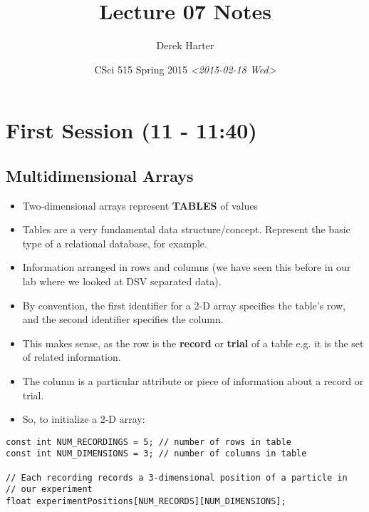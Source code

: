 \documentclass[11pt]{article}
\author{Derek Harter}
\date{CSci 515 Spring 2015 \textit{<2015-02-18 Wed>}}
\title{Lecture 07 Notes}
\begin{document}
\maketitle

\section{First Session (11 - 11:40)}
\label{sec-1}
\subsection{Multidimensional Arrays}
\label{sec-1-1}

\begin{itemize}
\item Two-dimensional arrays represent \textbf{TABLES} of values
\item Tables are a very fundamental data structure/concept.  Represent
the basic type of a relational database, for example.
\item Information arranged in rows and columns (we have seen this before
in our lab where we looked at DSV separated data).
\item By convention, the first identifier for a 2-D array specifies the
table's row, and the second identifier specifies the column.
\item This makes sense, as the row is the \textbf{record} or \textbf{trial} of a table
e.g. it is the set of related information.
\item The column is a particular attribute or piece of information about
a record or trial.
\item So, to initialize a 2-D array:
\end{itemize}

\begin{verbatim}
const int NUM_RECORDINGS = 5; // number of rows in table
const int NUM_DIMENSIONS = 3; // number of columns in table

// Each recording records a 3-dimensional position of a particle in
// our experiment
float experimentPositions[NUM_RECORDS][NUM_DIMENSIONS];
\end{verbatim}
\end{document}
